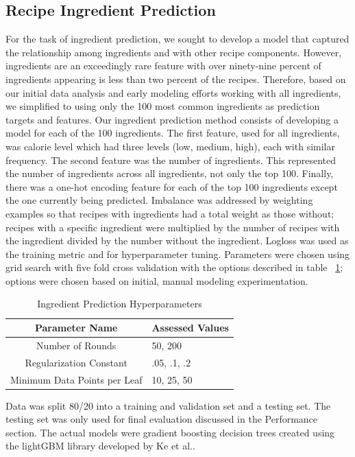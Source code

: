 \documentclass[sigconf]{acmart}
\begin{document}
\subsection{Recipe Ingredient Prediction}
For the task of ingredient prediction, we sought to develop a model that captured the relationship among ingredients and with other recipe components. However, ingredients are an exceedingly rare feature with over ninety-nine percent of ingredients appearing is less than two percent of the recipes. Therefore, based on our initial data analysis and early modeling efforts working with all ingredients, we simplified to using only the 100 most common ingredients as prediction targets and features. Our ingredient prediction method consists of developing a model for each of the 100 ingredients. The first feature, used for all ingredients, was calorie level which had three levels (low, medium, high), each with similar frequency. The second feature was the number of ingredients. This represented the number of ingredients across all ingredients, not only the top 100. Finally, there was a one-hot encoding feature for each of the top 100 ingredients except the one currently being predicted. Imbalance was addressed by weighting examples so that recipes with ingredients had a total weight as those without; recipes with a specific ingredient were multiplied by the number of recipes with the ingredient divided by the number without the ingredient. Logloss was used as the training metric and for hyperparameter tuning. Parameters were chosen using grid search with five fold cross validation with the options described in table ~\ref{table:ingred_pred_param_table}; options were chosen based on initial, manual modeling experimentation.
\begin{table}[h]
\begin{tabular}{|c|p{3cm}|}
\hline Parameter Name & Assessed Values \\
\hline Number of Rounds & 50, 200 \\
\hline Regularization Constant & .05, .1, .2 \\
\hline Minimum Data Points per Leaf & 10, 25, 50 \\
\hline
\end{tabular}
\caption{Ingredient Prediction Hyperparameters}
\label{table:ingred_pred_param_table}
\end{table}
Data was split 80/20 into a training and validation set and a testing set. The testing set was only used for final evaluation discussed in the Performance section. The actual models were gradient boosting decision trees created using the lightGBM library developed by Ke et al.\cite{NIPS2017_6449f44a}.
\end{document}
